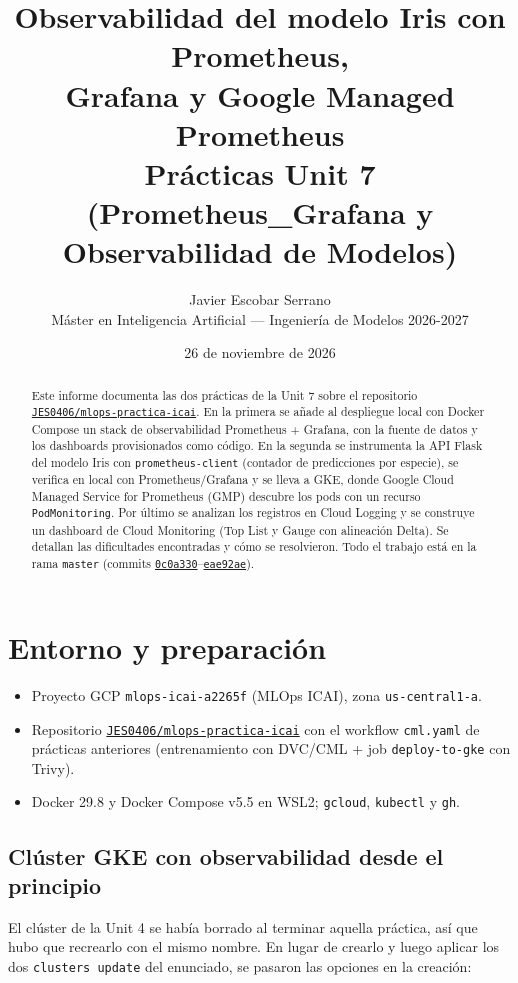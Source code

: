 \documentclass[11pt,a4paper]{article}
\title{\textbf{Observabilidad del modelo Iris con Prometheus,\\Grafana y Google Managed Prometheus}\\[0.4em]
\large Prácticas Unit 7 (Prometheus\_Grafana y Observabilidad de Modelos)}
\author{Javier Escobar Serrano\\
\small Máster en Inteligencia Artificial --- Ingeniería de Modelos 2026-2027}
\date{26 de noviembre de 2026}
\newcommand{\code}[1]{\texttt{#1}}
\newcommand{\repo}{\href{https://github.com/JES0406/mlops-practica-icai}{\code{JES0406/mlops-practica-icai}}}
\newcommand{\commit}[1]{\href{https://github.com/JES0406/mlops-practica-icai/commit/#1}{\code{#1}}}
\begin{document}
\sloppy
\maketitle
\thispagestyle{empty}

\begin{abstract}
Este informe documenta las dos prácticas de la Unit 7 sobre el repositorio \repo{}.
En la primera se añade al despliegue local con Docker Compose un stack de observabilidad
Prometheus + Grafana, con la fuente de datos y los dashboards provisionados como código.
En la segunda se instrumenta la API Flask del modelo Iris con \code{prometheus-client}
(contador de predicciones por especie), se verifica en local con Prometheus/Grafana y se
lleva a GKE, donde Google Cloud Managed Service for Prometheus (GMP) descubre los pods con
un recurso \code{PodMonitoring}. Por último se analizan los registros en Cloud Logging y se
construye un dashboard de Cloud Monitoring (Top List y Gauge con alineación Delta).
Se detallan las dificultades encontradas y cómo se resolvieron. Todo el trabajo está en la
rama \code{master} (commits \commit{0c0a330}--\commit{eae92ae}).
\end{abstract}

\newpage
\tableofcontents
\newpage

\section{Entorno y preparación}

\begin{itemize}[nosep]
  \item Proyecto GCP \code{mlops-icai-a2265f} (MLOps ICAI), zona \code{us-central1-a}.
  \item Repositorio \repo{} con el workflow \code{cml.yaml} de prácticas anteriores
        (entrenamiento con DVC/CML + job \code{deploy-to-gke} con Trivy).
  \item Docker 29.8 y Docker Compose v5.5 en WSL2; \code{gcloud}, \code{kubectl} y \code{gh}.
\end{itemize}

\subsection{Clúster GKE con observabilidad desde el principio}
El clúster de la Unit 4 se había borrado al terminar aquella práctica, así que hubo que
recrearlo con el mismo nombre. En lugar de crearlo y luego aplicar los dos
\code{clusters update} del enunciado, se pasaron las opciones en la creación:
\end{document}
